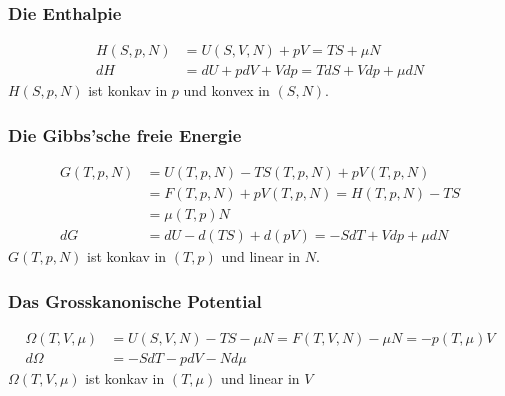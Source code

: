\subsubsection{Die Enthalpie}
\begin{align*}
    H(S,p,N) &= U(S,V,N) + p V = T S + \mu N
    \\
    dH &= dU + p dV + V dp = T dS + V dp + \mu dN
\end{align*}
$H(S,p,N)$ ist konkav in $p$ und konvex in $(S,N)$.

\subsubsection{Die Gibbs'sche freie Energie}
\begin{align*}
    G(T,p,N) &= U(T,p,N) - T S(T,p,N) + p V(T,p,N)
    \\
    &= F(T,p,N) + p V(T,p,N) = H(T,p,N) - T S
    \\
    &= \mu(T,p) N 
    \\
    dG &= dU - d(TS) + d(pV) = -S dT + V dp + \mu dN
\end{align*}
$G(T,p,N)$ ist konkav in $(T,p)$ und linear in $N$.

\subsubsection{Das Grosskanonische Potential}
\begin{align*}
    \Omega(T,V,\mu) &= U(S,V,N) - T S - \mu N
    = F(T,V,N) - \mu N
    = -p(T,\mu) V
    \\
    d \Omega &= - S dT - p dV - N d \mu
\end{align*}
$\Omega(T,V,\mu)$ ist konkav in $(T,\mu)$ und linear in $V$



